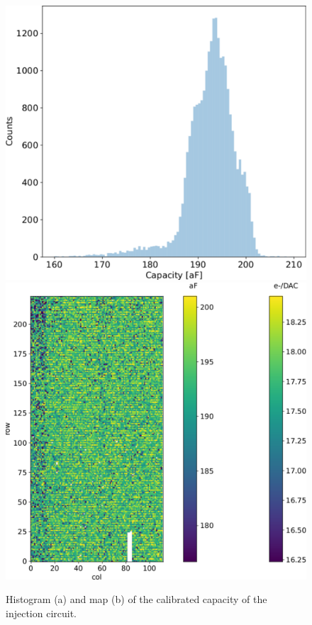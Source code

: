         \begin{figure}[h!]
            \centering
            \includegraphics[width=.49\linewidth]{figures/charaterization/capacity.pdf}
            \includegraphics[width=.49\linewidth]{figures/charaterization/conversion_factor_map.pdf}
            \caption{Histogram (a) and map (b) of the calibrated capacity of the injection circuit. }
            \label{fig:capacity_map}
        \end{figure}  


        
